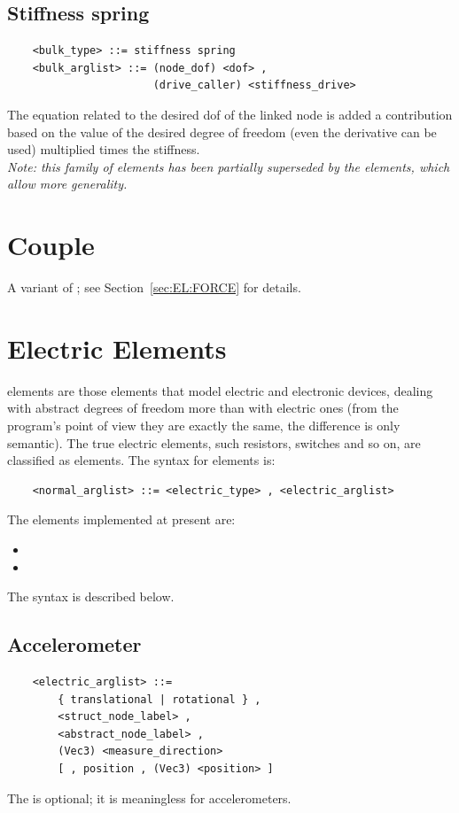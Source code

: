 \subsection{Stiffness spring}
\begin{verbatim}
    <bulk_type> ::= stiffness spring
    <bulk_arglist> ::= (node_dof) <dof> ,
                       (drive_caller) <stiffness_drive>
\end{verbatim}
The equation related to the desired dof of the linked node is added a
contribution based on the value of the desired degree of freedom (even the
derivative can be used) multiplied times the stiffness. \\
{\em Note: this family of elements has been partially superseded by the
 elements, which allow more generality.}




\section{Couple}
A variant of ; see Section~\ref{sec:EL:FORCE} for details.




\section{Electric Elements}
 elements are those elements that model electric and electronic
devices, dealing with abstract degrees of freedom more than with electric
ones (from the program's point of view they are exactly the same, the
difference is only semantic). The true electric elements, such resistors,
switches and so on, are classified as  elements.
The syntax for  elements is:
\begin{verbatim}
    <normal_arglist> ::= <electric_type> , <electric_arglist>
\end{verbatim}
The  elements implemented at present are:
\begin{itemize}
	\item {}
	\item {}
\end{itemize}
The syntax is described below.

\subsection{Accelerometer}
\begin{verbatim}
    <electric_arglist> ::=
        { translational | rotational } ,
        <struct_node_label> ,
        <abstract_node_label> ,
        (Vec3) <measure_direction>
        [ , position , (Vec3) <position> ]
\end{verbatim}
The  is optional; it is meaningless for 
accelerometers.


